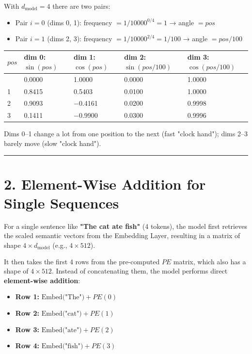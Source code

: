 \documentclass[11pt,a4paper,oneside]{report}
\providecommand{\tightlist}{\setlength{\itemsep}{0pt}\setlength{\parskip}{0pt}}
\begin{document}
With \(d_{\text{model}} = 4\) there are two pairs:

\begin{itemize}
\tightlist
\item
  Pair \(i = 0\) (dims 0, 1): frequency \(= 1 / 10000^{0/4} = 1\) → angle \(= pos\)
\item
  Pair \(i = 1\) (dims 2, 3): frequency \(= 1 / 10000^{2/4} = 1/100\) → angle \(= pos / 100\)
\end{itemize}

{\def\LTcaptype{none} %
\begin{longtable}[]{@{}lllll@{}}
\toprule\noalign{}
\(pos\) & dim 0: \(\sin(pos)\) & dim 1: \(\cos(pos)\) & dim 2: \(\sin(pos/100)\) & dim 3: \(\cos(pos/100)\) \\
\midrule\noalign{}
\endhead
\bottomrule\noalign{}
\endlastfoot
0 & 0.0000 & 1.0000 & 0.0000 & 1.0000 \\
1 & 0.8415 & 0.5403 & 0.0100 & 1.0000 \\
2 & 0.9093 & −0.4161 & 0.0200 & 0.9998 \\
3 & 0.1411 & −0.9900 & 0.0300 & 0.9996 \\
\end{longtable}
}

Dims 0--1 change a lot from one position to the next (fast "clock hand"); dims 2--3 barely move (slow "clock hand").

\begin{center}\rule{0.5\linewidth}{0.5pt}\end{center}

\section{2. Element-Wise Addition for Single Sequences}\label{2-element-wise-addition-for-single-sequences}

For a single sentence like \textbf{"The cat ate fish"} (4 tokens), the model first retrieves the scaled semantic vectors from the Embedding Layer, resulting in a matrix of shape \(4 \times d_{\text{model}}\) (e.g., \(4 \times 512\)).

It then takes the first 4 rows from the pre-computed \(PE\) matrix, which also has a shape of \(4 \times 512\). Instead of concatenating them, the model performs direct \textbf{element-wise addition}:

\begin{itemize}
\tightlist
\item
  \textbf{Row 1:} \(\text{Embed("The")} + PE(0)\)
\item
  \textbf{Row 2:} \(\text{Embed("cat")} + PE(1)\)
\item
  \textbf{Row 3:} \(\text{Embed("ate")} + PE(2)\)
\item
  \textbf{Row 4:} \(\text{Embed("fish")} + PE(3)\)
\end{itemize}
\end{document}

